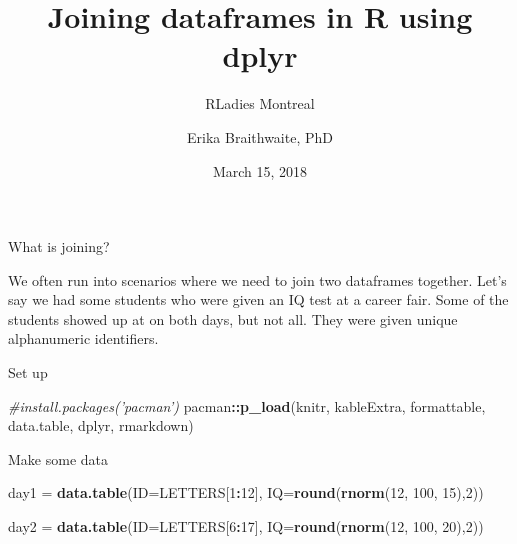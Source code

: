 \documentclass[ignorenonframetext,]{beamer}
\title{Joining dataframes in R using dplyr}
\subtitle{RLadies Montreal}
\author{Erika Braithwaite, PhD}
\date{March 15, 2018}
\newenvironment{Shaded}{\begin{snugshade}}{\end{snugshade}}
\newcommand{\KeywordTok}[1]{\textcolor[rgb]{0.13,0.29,0.53}{\textbf{#1}}}
\newcommand{\DataTypeTok}[1]{\textcolor[rgb]{0.13,0.29,0.53}{#1}}
\newcommand{\DecValTok}[1]{\textcolor[rgb]{0.00,0.00,0.81}{#1}}
\newcommand{\StringTok}[1]{\textcolor[rgb]{0.31,0.60,0.02}{#1}}
\newcommand{\CommentTok}[1]{\textcolor[rgb]{0.56,0.35,0.01}{\textit{#1}}}
\newcommand{\OperatorTok}[1]{\textcolor[rgb]{0.81,0.36,0.00}{\textbf{#1}}}
\newcommand{\NormalTok}[1]{#1}
\begin{document}
\frame{\titlepage}

\begin{frame}[fragile]{What is joining?}

We often run into scenarios where we need to join two dataframes
together. Let's say we had some students who were given an IQ test at a
career fair. Some of the students showed up at on both days, but not
all. They were given unique alphanumeric identifiers.

Set up

\begin{Shaded}
\begin{Highlighting}[]
\CommentTok{#install.packages('pacman')}
\NormalTok{pacman}\OperatorTok{::}\KeywordTok{p_load}\NormalTok{(knitr, kableExtra, formattable, data.table, dplyr,  rmarkdown)}
\end{Highlighting}
\end{Shaded}

Make some data

\begin{Shaded}
\begin{Highlighting}[]
\NormalTok{day1 =}\StringTok{  }\KeywordTok{data.table}\NormalTok{(}\DataTypeTok{ID=}\NormalTok{LETTERS[}\DecValTok{1}\OperatorTok{:}\DecValTok{12}\NormalTok{],}
                 \DataTypeTok{IQ=}\KeywordTok{round}\NormalTok{(}\KeywordTok{rnorm}\NormalTok{(}\DecValTok{12}\NormalTok{, }\DecValTok{100}\NormalTok{, }\DecValTok{15}\NormalTok{),}\DecValTok{2}\NormalTok{))}

\NormalTok{day2 =}\StringTok{  }\KeywordTok{data.table}\NormalTok{(}\DataTypeTok{ID=}\NormalTok{LETTERS[}\DecValTok{6}\OperatorTok{:}\DecValTok{17}\NormalTok{],}
                 \DataTypeTok{IQ=}\KeywordTok{round}\NormalTok{(}\KeywordTok{rnorm}\NormalTok{(}\DecValTok{12}\NormalTok{, }\DecValTok{100}\NormalTok{, }\DecValTok{20}\NormalTok{),}\DecValTok{2}\NormalTok{))}
\end{Highlighting}
\end{Shaded}

\end{frame}
\end{document}
